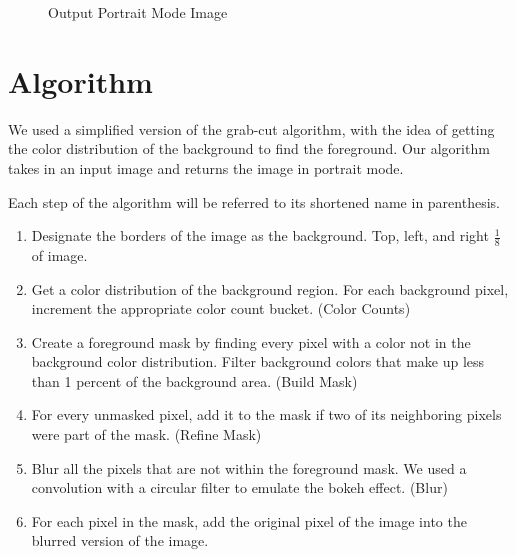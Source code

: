 \documentclass[12pt]{article}
\begin{document}
\begin{figure}[!htb]
\begin{minipage}{0.48\textwidth}
        \caption{Output Portrait Mode Image}
    \end{minipage}\hfill
\end{figure}

\section{Algorithm}

We used a simplified version of the grab-cut algorithm, with the idea of
getting the color distribution of the background to find the foreground. Our
algorithm takes in an input image and returns the image in portrait mode.

Each step of the algorithm will be referred to its shortened name in
parenthesis.

\begin{enumerate}
    \item
        Designate the borders of the image as the background. Top, left, and
        right $\tfrac{1}{8}$ of image.
    \item
        Get a color distribution of the background region. For each background
        pixel, increment the appropriate color count bucket. (Color Counts)
    \item
        Create a foreground mask by finding every pixel with a color not
        in the background color distribution. Filter background colors that
        make up less than 1 percent of the background area. (Build Mask)
    \item
        For every unmasked pixel, add it to the mask if two of its neighboring
        pixels were part of the mask. (Refine Mask)
    \item
        Blur all the pixels that are not within the foreground mask. We used a
        convolution with a circular filter to emulate the bokeh effect. (Blur)
    \item
        For each pixel in the mask, add the original pixel of the image into
        the blurred version of the image.
\end{enumerate}
\end{document}
